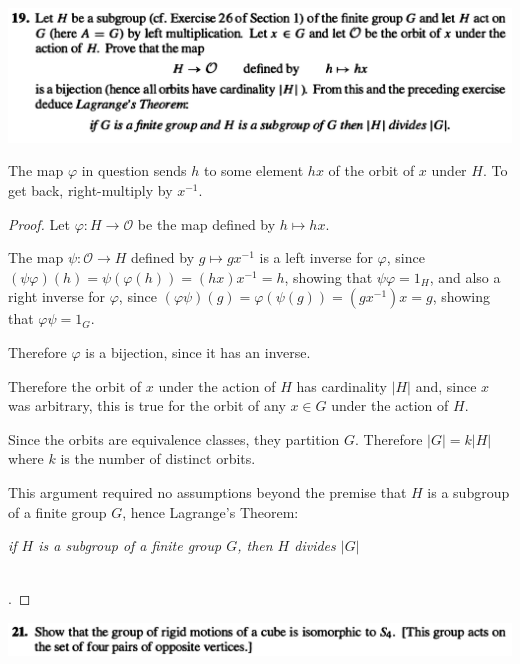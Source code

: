 \newpage
\begin{mdframed}
\includegraphics[width=400pt]{img/abstract-algebra--nf--4-4140.png}
\end{mdframed}

\begin{intuition*}
  The map $\varphi$ in question sends $h$ to some element $hx$ of the orbit of $x$ under $H$.
  To get back, right-multiply by $x^{-1}$.
\end{intuition*}

\begin{proof}
  Let $\varphi: H \to \mathcal O$ be the map defined by $h \mapsto hx$.

  The map $\psi: \mathcal O \to H$ defined by $g \mapsto gx^{-1}$ is a left inverse for $\varphi$,
  since $(\psi\varphi)(h) = \psi(\varphi(h)) = (hx)x^{-1} = h$, showing that $\psi\varphi = 1_H$, and also a right inverse
  for $\varphi$, since $(\varphi\psi)(g) = \varphi(\psi(g)) = (gx^{-1})x = g$, showing that $\varphi\psi = 1_G$.

  Therefore $\varphi$ is a bijection, since it has an inverse.

  Therefore the orbit of $x$ under the action of $H$ has cardinality $|H|$ and, since $x$ was
  arbitrary, this is true for the orbit of any $x \in G$ under the action of $H$.

  Since the orbits are equivalence classes, they partition $G$. Therefore $|G| = k|H|$ where $k$ is
  the number of distinct orbits.

  This argument required no assumptions beyond the premise that $H$ is a subgroup of a finite
  group $G$, hence Lagrange's Theorem:

  {\it if $H$ is a subgroup of a finite group $G$, then $H$ divides $|G|$}


  ~\\
.
\end{proof}

\newpage
\begin{mdframed}
\includegraphics[width=400pt]{img/abstract-algebra--nf--4-0e63.png}
\end{mdframed}

